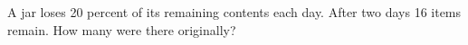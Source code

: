 A jar loses 20 percent of its remaining contents each day. After two days 16 items remain. How many were there originally?
